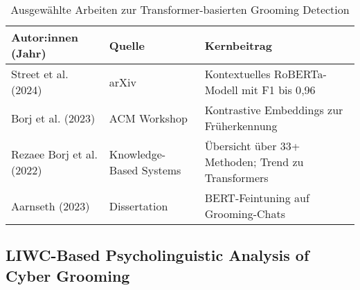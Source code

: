 \begin{table}[h]
\centering
\begin{tabular}{|p{4cm}|p{3cm}|p{7cm}|}
\hline
\textbf{Autor:innen (Jahr)} & \textbf{Quelle} & \textbf{Kernbeitrag} \\
\hline
Street et al. (2024) & arXiv & Kontextuelles RoBERTa-Modell mit F1 bis 0{,}96 \\
\hline
Borj et al. (2023) & ACM Workshop & Kontrastive Embeddings zur Früherkennung \\
\hline
Rezaee Borj et al. (2022) & Knowledge-Based Systems & Übersicht über 33+ Methoden; Trend zu Transformers \\
\hline
Aarnseth (2023) & Dissertation & BERT-Feintuning auf Grooming-Chats \\
\hline
\end{tabular}
\caption{Ausgewählte Arbeiten zur Transformer-basierten Grooming Detection}
\end{table}




\subsection{LIWC-Based Psycholinguistic Analysis of Cyber Grooming}







\begin{comment}
    . Cano et al. (2020)
→ Ja, explizite LIWC-Nutzung.

Verwendeten LIWC-Features als Input für maschinelle Lernverfahren zur Grooming-Erkennung.

Ziel: Modellleistung und Interpretierbarkeit verbessern.

Zeigten, dass affektive und kognitive LIWC-Kategorien besonders wertvoll sind.

�� Fazit: LIWC ist integraler Bestandteil der Feature-Engine.
\end{comment}

